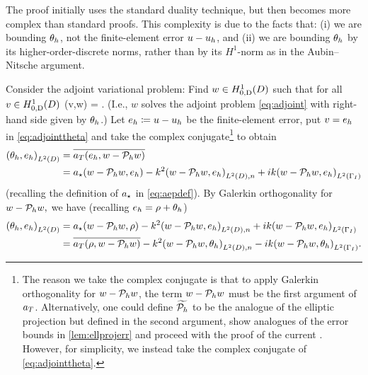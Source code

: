 The proof initially uses the standard duality technique, but then becomes more complex than standard proofs. This complexity is due to the facts that: (i) we are bounding $\theta_{h}$, not the finite-element error $u-u_{h}$, and (ii) we are bounding $\theta_{h}$ by its higher-order-discrete norms, rather than by its $H^1$-norm as in the Aubin--Nitsche argument.

Consider the adjoint variational problem: Find $w \in \HozDD$ such that for all $v \in \HozDD$
\beq\label{eq:adjointtheta}
\aT(v,w) = .
\eeq
(I.e., $w$ solves the adjoint problem \cref{eq:adjoint} with right-hand side given by $\theta_{h}$.) Let $e_{h} \coloneqq u -u_{h}$ be the finite-element error, put $v = e_{h}$ in \cref{eq:adjointtheta} and take the complex conjugate\footnote{The reason we take the complex conjugate is that to apply Galerkin orthogonality for $w-\mathcal P_{h} w$, the term $w-\mathcal P_{h} w$ must be the first argument of $a_{T}$. Alternatively, one could define $\widetilde{\mathcal P_{h}}$ to be the analogue of the elliptic projection but defined in the second argument, show analogues of the error bounds in \cref{lem:ellprojerr} and proceed with the proof of the current . However, for simplicity, we instead take the complex conjugate of \cref{eq:adjointtheta}.} to obtain
\begin{align*}
  \IPLtD{\thetah}{\eh} &= \overline{\aT(\eh,w-\Ph w)}\\
  &= \aep(w-\Ph w,\eh) - k^2 \IPLtDn{w-\Ph w}{\eh} + ik \IPLtGI{w - \Ph w}{\eh}
\end{align*}
(recalling the definition of $a_{\star}$ in \cref{eq:aepdef}). By Galerkin orthogonality for $w-\mathcal P_{h} w,$ we have (recalling $e_{h} = \rho + \theta_{h}$)
\begin{align}
  \IPLtD{\thetah}{\eh} &= \aep(w-\Ph w,\rho) - k^2 \IPLtDn{w-\Ph w}{\eh} + ik \IPLtGI{w - \Ph w}{\eh}\nonumber\\
&= \overline{\aT(\rho,w-\Ph w)}  -k^2 \IPLtDn{w-\Ph w}{\thetah} -ik \IPLtGI{w-\Ph w}{\thetah}.\label{eq:doublego}
\end{align}

